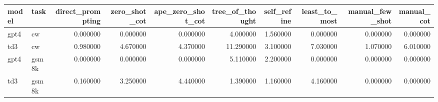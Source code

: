 \begin{tabular}{llrrrrrrrr}
\toprule
model & task & direct_prompting & zero_shot_cot & ape_zero_shot_cot & tree_of_thought & self_refine & least_to_most & manual_few_shot & manual_cot \\
\midrule
gpt4 & cw & 0.000000 & 0.000000 & 0.000000 & 4.000000 & 1.560000 & 0.000000 & 0.000000 & 0.000000 \\
td3 & cw & 0.980000 & 4.670000 & 4.370000 & 11.290000 & 3.100000 & 7.030000 & 1.070000 & 6.010000 \\
gpt4 & gsm8k & 0.000000 & 0.000000 & 0.000000 & 5.110000 & 2.200000 & 0.000000 & 0.000000 & 0.000000 \\
td3 & gsm8k & 0.160000 & 3.250000 & 4.440000 & 1.390000 & 1.160000 & 4.160000 & 0.000000 & 0.000000 \\
\bottomrule
\end{tabular}
